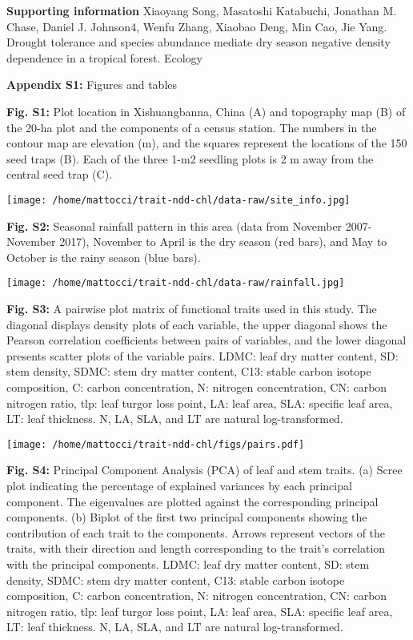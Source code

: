 \documentclass[
  12pt,
  letterpaper,
  DIV=11,
  numbers=noendperiod]{scrartcl}
\author{}
\date{}
\begin{document}
\newpage

\textbf{Supporting information} Xiaoyang Song, Masatoshi Katabuchi,
Jonathan M. Chase, Daniel J. Johnson4, Wenfu Zhang, Xiaobao Deng, Min
Cao, Jie Yang. Drought tolerance and species abundance mediate dry
season negative density dependence in a tropical forest. Ecology

\textbf{Appendix S1: } Figures and tables

\textbf{Fig. S1:} Plot location in Xishuangbanna, China (A) and
topography map (B) of the 20-ha plot and the components of a census
station. The numbers in the contour map are elevation (m), and the
squares represent the locations of the 150 seed traps (B). Each of the
three 1-m2 seedling plots is 2 m away from the central seed trap (C).

\texttt{[image: /home/mattocci/trait-ndd-chl/data-raw/site\_info.jpg]}

\newpage

\textbf{Fig. S2:} Seasonal rainfall pattern in this area (data from
November 2007- November 2017), November to April is the dry season (red
bars), and May to October is the rainy season (blue bars).

\texttt{[image: /home/mattocci/trait-ndd-chl/data-raw/rainfall.jpg]}

\newpage

\textbf{Fig. S3:} A pairwise plot matrix of functional traits used in
this study. The diagonal displays density plots of each variable, the
upper diagonal shows the Pearson correlation coefficients between pairs
of variables, and the lower diagonal presents scatter plots of the
variable pairs. LDMC: leaf dry matter content, SD: stem density, SDMC:
stem dry matter content, C13: stable carbon isotope composition, C:
carbon concentration, N: nitrogen concentration, CN: carbon nitrogen
ratio, tlp: leaf turgor loss point, LA: leaf area, SLA: specific leaf
area, LT: leaf thickness. N, LA, SLA, and LT are natural
log-transformed.

\texttt{[image: /home/mattocci/trait-ndd-chl/figs/pairs.pdf]}

\newpage

\textbf{Fig. S4:} Principal Component Analysis (PCA) of leaf and stem
traits. (a) Scree plot indicating the percentage of explained variances
by each principal component. The eigenvalues are plotted against the
corresponding principal components. (b) Biplot of the first two
principal components showing the contribution of each trait to the
components. Arrows represent vectors of the traits, with their direction
and length corresponding to the trait's correlation with the principal
components. LDMC: leaf dry matter content, SD: stem density, SDMC: stem
dry matter content, C13: stable carbon isotope composition, C: carbon
concentration, N: nitrogen concentration, CN: carbon nitrogen ratio,
tlp: leaf turgor loss point, LA: leaf area, SLA: specific leaf area, LT:
leaf thickness. N, LA, SLA, and LT are natural log-transformed.
\end{document}
